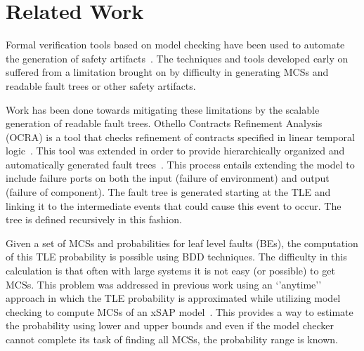 \section{Related Work}
\label{sec:related_work}

Formal verification tools based on model checking have been used to automate the generation of safety artifacts~\cite{symbAltaRica,10.1007/978-3-540-75596-8-13, DBLP:conf/tacas/BittnerBCCGGMMZ16}. The techniques and tools developed early on suffered from a limitation brought on by difficulty in generating MCSs and readable fault trees or other safety artifacts.

 Work has been done towards mitigating these limitations by the scalable generation of readable fault trees. Othello Contracts Refinement Analysis (OCRA) is a tool that checks refinement of contracts specified in linear temporal logic~\cite{6693137}. This tool was extended in order to provide hierarchically organized and automatically generated fault trees~\cite{10.1007/978-3-319-11936-6-7}. This process entails extending the model to include failure ports on both the input (failure of environment) and output (failure of component). The fault tree is generated starting at the TLE and linking it to the intermediate events that could cause this event to occur. The tree is defined recursively in this fashion. 

Given a set of MCSs and probabilities for leaf level faults (BEs), the computation of this TLE probability is possible using BDD techniques. The difficulty in this calculation is that often with large systems it is not easy (or possible) to get MCSs. This problem was addressed in previous work using an `'anytime'' approach in which the TLE probability is approximated while utilizing model checking to compute MCSs of an xSAP model~\cite{CAV2015:BoCiGrMa,mattareiThesis}. This provides a way to estimate the probability using lower and upper bounds and even if the model checker cannot complete its task of finding all MCSs, the probability range is known. 


